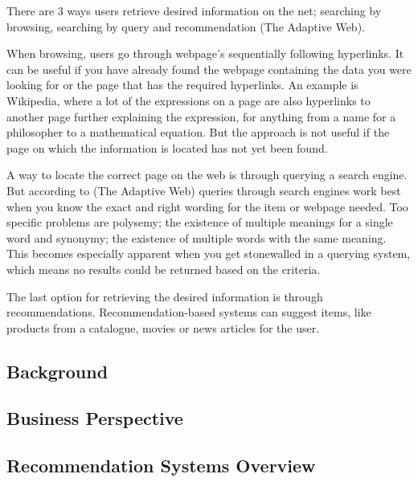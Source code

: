 There are 3 ways users retrieve desired information on the net; searching by browsing, searching by query and recommendation (The Adaptive Web).

When browsing, users go through webpage's sequentially following hyperlinks. It can be useful if you have already found the webpage containing the data you were looking for or the page that has the required hyperlinks. An example is Wikipedia, where a lot of the expressions on a page are also hyperlinks to another page further explaining the expression, for anything from a name for a philosopher to a mathematical equation. But the approach is not useful if the page on which the information is located has not yet been found.

A way to locate the correct page on the web is through querying a search engine. But according to (The Adaptive Web) queries through search engines work best when you know the exact and right wording for the item or webpage needed. Too specific problems are polysemy; the existence of multiple meanings for a single word and synonymy; the existence of multiple words with the same meaning. This becomes especially apparent when you get stonewalled in a querying system, which means no results could be returned based on the criteria.

The last option for retrieving the desired information is through recommendations. Recommendation-based systems can suggest items, like products from a catalogue, movies or news articles for the user.


\subsection{Background}
\label{Background}

\subsection{Business Perspective}
\label{BusiPers}

\subsection{Recommendation Systems Overview}
\label{Overview}
